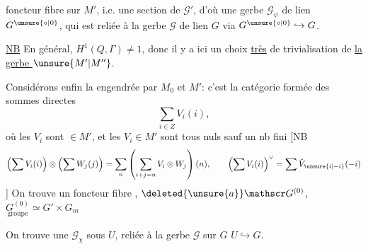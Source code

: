 foncteur fibre  sur $M'$, i.e. une section de $\mathscr G'$, d'où une   gerbe $\mathscr G_\psi$ de lien $G^{\unsure{\circ|0}}$, qui  est  reliée à la gerbe $\mathscr G$ de lien $G$ via $G^{\unsure{\circ|0}}\hookrightarrow G$.

\uline{NB} En général, $H^1(Q,\Gamma)\ne1$, donc il y a ici un choix \uline{très}  de trivialisation de \uline{la gerbe $\unsure{M'|M''}$}.

Considérons enfin la    engendrée par $M_0$ et $M'$: c'est la catégorie formée des sommes directes
\[
\sum_{i\in Z}V_i(i),
\]
où les $V_i$ sont $\in M'$, et les $V_i\in M'$ sont tous nuls sauf un nb fini
[NB
\[
\left(\sum V_i(i)\right)\otimes\left(\sum W_j(j)\right)=\sum_n\left(\sum_{i+j=n}V_i\otimes W_j\right)(n),\qquad
\left(\sum V_i(i)\right)^\vee=\sum\check V_{\unsure{i|-i}}(-i)
\]
]
On trouve un foncteur fibre
,
$\deleted{\unsure{a}}\mathscr G^{(0)}$, $\underset{\text{groupe}}{G^{(0)}}\simeq G'\times G_m$

On trouve une   $\mathscr G_\chi$ sous $U$, reliée à la gerbe $\mathscr G$ sur $G$   $U\hookrightarrow G$.
